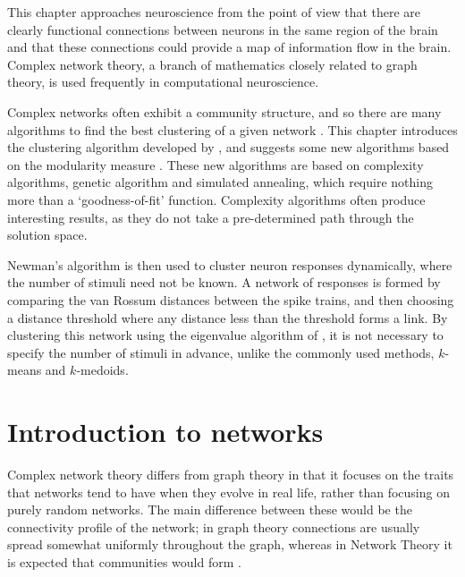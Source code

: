 
This chapter approaches neuroscience from the point of view that there are
clearly functional connections between neurons in the same region of the brain and
that these connections could provide a map of information flow in the brain.  Complex network theory, a branch 
of mathematics closely related to graph theory, is used frequently in computational neuroscience. 

Complex networks often exhibit a community structure, and so there are many algorithms to find the best clustering of a given network \citep{KarypisHanKumar2000a,NewmanGirvan2004a,Newman2006b}. This chapter introduces the clustering algorithm developed by \citet{Newman2006b}, and suggests some new algorithms based on the modularity measure \citep{NewmanGirvan2004a}.  These new algorithms are based on complexity algorithms, genetic algorithm and simulated annealing, which require nothing more than a \lq{}goodness-of-fit\rq{} function.  Complexity algorithms often produce interesting results, as they do not take a pre-determined path through the solution space.

Newman's algorithm \citep{Newman2006b} is then used to cluster neuron responses dynamically, where the number of stimuli need not be known. A network of responses is formed by comparing the van Rossum distances between the spike trains, and then choosing a distance threshold where any distance less than the threshold forms a link.  By clustering this network using the eigenvalue algorithm of \citet{Newman2006a}, it is not necessary to specify the number of stimuli in advance, unlike the commonly used methods, $k$-means and $k$-medoids.


\section{Introduction to networks}
Complex network theory differs from 
graph theory in that it focuses on the traits that networks tend to have when they evolve in real life, rather than focusing on purely random networks.  
The main difference between these would be the connectivity profile of the 
network; in graph theory connections are usually spread somewhat uniformly 
throughout the graph, whereas in Network Theory it is  expected that communities would form \citep{Newman2010a}.

